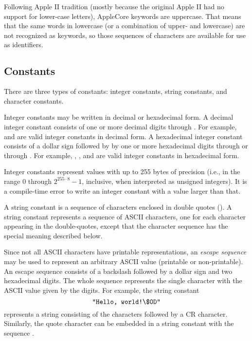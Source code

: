 \documentclass[10pt]{article}
\begin{document}
Following Apple II tradition (mostly because the original Apple II had
no support for lower-case letters), AppleCore keywords are uppercase.
That means that the same words in lowercase (or a combination of
upper- and lowercase) are not recognized as keywords, so those
sequences of characters are available for use as identifiers.

\subsection{Constants}
\label{sec:lexical:constants}

There are three types of constants: integer constants, string
constants, and character constants.  

 Integer constants may be written in decimal
or hexadecimal form.  A decimal integer constant consists of one or
more decimal digits  through .  For example,  and
 are valid integer constants in decimal form.  A hexadecimal
integer constant consists of a dollar sign \kwd{\$} followed by by one
or more hexadecimal digits  through  or  through
.  For example, , , and  are
valid integer constants in hexadecimal form.

Integer constants represent values with up to 255 bytes of precision
(i.e., in the range $0$ through $2^{255 \cdot 8}-1$, inclusive, when
interpreted as unsigned integers).  It is a compile-time error to
write an integer constant with a value larger than that.

 A string constant is a sequence of
characters enclosed in double quotes ().  A string constant
represents a sequence of ASCII characters, one for each character
appearing in the double-quotes, except that the character sequence
\kwd{\bs\$} has the special meaning described below.

Since not all ASCII characters have printable representations, an
\emph{escape sequence} may be used to represent an arbitrary ASCII
value (printable or non-printable).  An escape sequence consists of a
backslash \kwd{\bs} followed by a dollar sign \kwd{\$} and two
hexadecimal digits.  The whole sequence represents the single
character with the ASCII value given by the digits.  For example, the
string constant
%
$$\texttt{"Hello, world!\textbackslash\$0D"}$$
%
represents a string consisting of the characters 
followed by a CR character.  Similarly, the quote character 
can be embedded in a string constant with the sequence .
\end{document}
